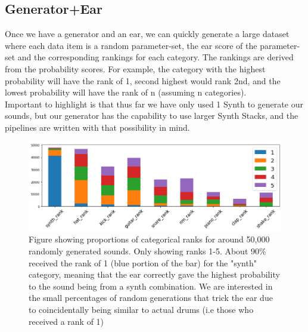 \documentclass{article}
\begin{document}
\subsection{Generator+Ear}
Once we have a generator and an ear, we can quickly generate a large dataset where each data item is a random parameter-set, the ear score of the parameter-set and the corresponding rankings for each category. The rankings are derived from the probability scores. For example, the category with the highest probability will have the rank of 1, second highest would rank 2nd, and the lowest probability will have the rank of n (assuming n categories).\\
Important to highlight is that thus far we have only used 1 Synth to generate our sounds, but our generator has the capability to use larger Synth Stacks, and the pipelines are written with that possibility in mind.\\
\begin{figure}[h!]
\centering
\includegraphics[width=1\linewidth]{images/random_ranks.png}
\caption{Figure showing proportions of categorical ranks for around 50,000 randomly generated sounds. Only showing ranks 1-5. About 90\% received the rank of 1 (blue portion of the bar) for the "synth" category, meaning that the ear correctly gave the highest probability to the sound being from a synth combination. We are interested in the small percentages of random generations that trick the ear due to coincidentally being similar to actual drums (i.e those who received a rank of 1) }


\label{fig:rank portions}
\end{figure}
\end{document}
